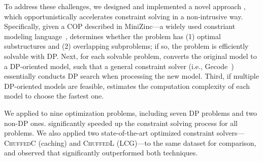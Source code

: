 To address these challenges, we designed and implemented a novel approach \tool, which opportunistically accelerates constraint solving in a non-intrusive way. 
Specifically, given a COP described in MiniZinc---a widely used constriant modeling language~\cite{nethercote2007minizinc}, \tool determines  whether the problem has (1) optimal substructures and (2) overlapping subproblems; if so, the problem is efficiently solvable with DP. Next, for each solvable problem, \tool
converts the original model to a DP-oriented model, such that a general constraint solver (i.e., Gecode~\cite{schulte2006gecode}) essentially conducts DP search when processing the new model. 
Third, if multiple DP-oriented models are feasible, \tool estimates the computation complexity of each model to choose the fastest one.  

We applied \tool to nine optimization problems, 
including seven DP problems and two non-DP ones. \tool significantly speeded up the constraint solving process for all problems.  
We also applied two state-of-the-art optimized constraint solvers---\textsc{ChuffedC} (caching) and \textsc{ChuffedL} (LCG)---to the same dataset for comparison, and observed that \tool significantly outperformed both techniques. 



	
	
